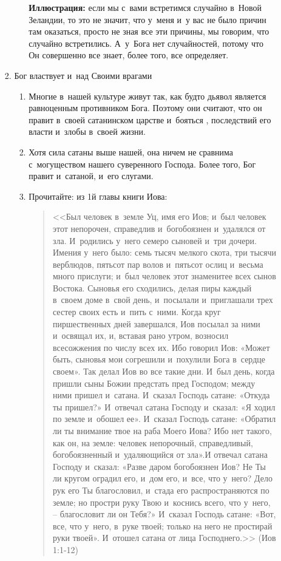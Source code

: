 \documentclass[a4paper,12pt]{article}
\begin{document}
\begin{enumerate}
\begin{itemize}
\begin{enumerate}
\begin{enumerate}
            \textbf{Иллюстрация:} если мы с~вами встретимся случайно в~Новой Зеландии, то это не значит, что у~меня и~у вас не было причин там оказаться, просто не зная все эти причины, мы говорим, что случайно встретились. А~у~Бога нет случайностей, потому что Он совершенно все знает, более того, все определяет.
        \end{enumerate}
        \item Бог властвует и~над Своими врагами
        \begin{enumerate}
            \item Многие в~нашей культуре живут так, как будто дьявол является равноценным противником Бога. Поэтому они считают, что он правит в~своей сатанинском царстве и~бояться , последствий его власти и~злобы в~своей жизни. 
            \item Хотя сила сатаны выше нашей, она ничем не сравнима с~могуществом нашего суверенного Господа. Более того, Бог правит и~сатаной, и~его слугами. 
            \item Прочитайте: из 1й главы книги Иова: 
            \begin{quote}
            <<Был человек в~земле Уц, имя его Иов; и~был человек этот непорочен, справедлив и~богобоязнен и~удалялся от зла. И~родились у~него семеро сыновей и~три дочери. Имения у~него было: семь тысяч мелкого скота, три тысячи верблюдов, пятьсот пар волов и~пятьсот ослиц и~весьма много прислуги; и~был человек этот знаменитее всех сынов Востока. Сыновья его сходились, делая пиры каждый в~своем доме в~свой день, и~посылали и~приглашали трех сестер своих есть и~пить с~ними. Когда круг пиршественных дней завершался, Иов посылал за ними и~освящал их, и, вставая рано утром, возносил всесожжения по числу всех их. Ибо говорил Иов: «Может быть, сыновья мои согрешили и~похулили Бога в~сердце своем». Так делал Иов во все такие дни. И~был день, когда пришли сыны Божии предстать пред Господом; между ними пришел и~сатана. И~сказал Господь сатане: «Откуда ты пришел?» И~отвечал сатана Господу и~сказал: «Я ходил по земле и~обошел ее». И~сказал Господь сатане: «Обратил ли ты внимание твое на раба Моего Иова? Ибо нет такого, как он, на земле: человек непорочный, справедливый, богобоязненный и~удаляющийся от зла».И отвечал сатана Господу и~сказал: «Разве даром богобоязнен Иов? Не Ты ли кругом оградил его, и~дом его, и~все, что у~него? Дело рук его Ты благословил, и~стада его распространяются по земле; но простри руку Твою и~коснись всего, что у~него, – благословит ли он Тебя?» И~сказал Господь сатане: «Вот, все, что у~него, в~руке твоей; только на него не простирай руки твоей». И~отошел сатана от лица Господнего.>> (Иов 1:1-12)

\end{quote}
\end{enumerate}
\end{enumerate}
\end{itemize}
\end{enumerate}
\end{document}
